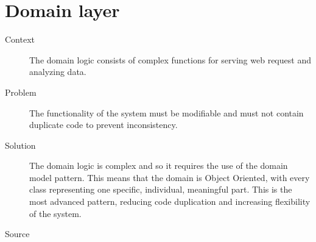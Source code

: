 %
%
%
%
%
%


\section{Domain layer}

\begin{description}
\item [Context]
The domain logic consists of complex functions for serving web request and analyzing data.

\item [Problem]
The functionality of the system must be modifiable and must not contain duplicate code to prevent inconsistency.

\item [Solution]
The domain logic is complex and so it requires the use of the domain model pattern. This means that the domain is Object Oriented, with every class representing one specific, individual, meaningful part.
This is the most advanced pattern, reducing code duplication and increasing flexibility of the system.

%

\item [Source]

\end{description}

